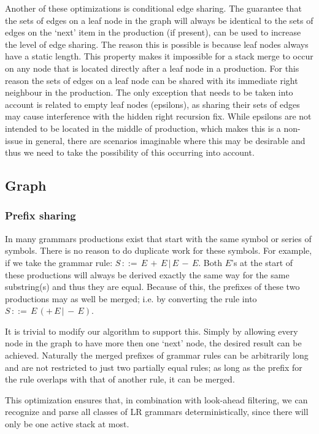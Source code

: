 \documentclass[a4paper,10pt]{article}
\begin{document}
Another of these optimizations is conditional edge sharing. The guarantee that the sets of edges on a leaf node in the graph will always be identical to the sets of edges on the `next' item in the production (if present), can be used to increase the level of edge sharing. The reason this is possible is because leaf nodes always have a static length. This property makes it impossible for a stack merge to occur on any node that is located directly after a leaf node in a production. For this reason the sets of edges on a leaf node can be shared with its immediate right neighbour in the production. The only exception that needs to be taken into account is related to empty leaf nodes (epsilons), as sharing their sets of edges may cause interference with the hidden right recursion fix. While epsilons are not intended to be located in the middle of production, which makes this is a non-issue in general, there are scenarios imaginable where this may be desirable and thus we need to take the possibility of this occurring into account.

\subsection{Graph}

\subsubsection{Prefix sharing}
\label{sec:prefixSharing}
In many grammars productions exist that start with the same symbol or series of symbols. There is no reason to do duplicate work for these symbols. For example, if we take the grammar rule: $S\,::=\,E\,+\,E\,|\,E\,-\,E$. Both $E$'s at the start of these productions will always be derived exactly the same way for the same substring(s) and thus they are equal. Because of this, the prefixes of these two productions may as well be merged; i.e. by converting the rule into $S\,::=\,E\,(+\,E\,|\,-\,E)$.

It is trivial to modify our algorithm to support this. Simply by allowing every node in the graph to have more then one `next' node, the desired result can be achieved. Naturally the merged prefixes of grammar rules can be arbitrarily long and are not restricted to just two partially equal rules; as long as the prefix for the rule overlaps with that of another rule, it can be merged.

This optimization ensures that, in combination with look-ahead filtering, we can recognize and parse all classes of LR grammars deterministically, since there will only be one active stack at most.
\end{document}
